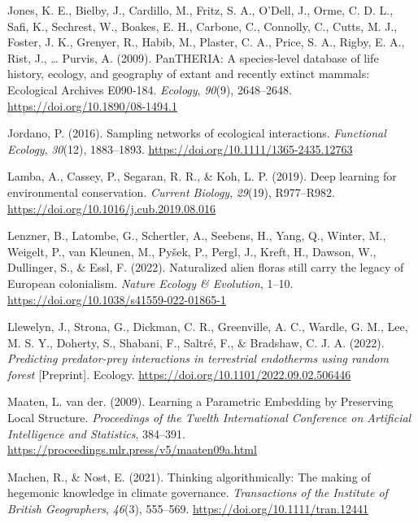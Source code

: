 \documentclass[10pt,oneside]{article}
\newlength{\cslhangindent}
\newenvironment{CSLReferences}[2] %
 {%
  \setlength{\parindent}{0pt}
  \ifodd #1 \everypar{\setlength{\hangindent}{\cslhangindent}}\ignorespaces\fi
  \ifnum #2 > 0
  \setlength{\parskip}{#2\baselineskip}
  \fi
 }%
 {}
\begin{document}
\begin{CSLReferences}{1}{0}
\leavevmode{}%
Jones, K. E., Bielby, J., Cardillo, M., Fritz, S. A., O'Dell, J., Orme,
C. D. L., Safi, K., Sechrest, W., Boakes, E. H., Carbone, C., Connolly,
C., Cutts, M. J., Foster, J. K., Grenyer, R., Habib, M., Plaster, C. A.,
Price, S. A., Rigby, E. A., Rist, J., \ldots{} Purvis, A. (2009).
PanTHERIA: A species‐level database of life history, ecology, and
geography of extant and recently extinct mammals: Ecological Archives
E090‐184. \emph{Ecology}, \emph{90}(9), 2648--2648.
\url{https://doi.org/10.1890/08-1494.1}

\leavevmode{}%
Jordano, P. (2016). Sampling networks of ecological interactions.
\emph{Functional Ecology}, \emph{30}(12), 1883--1893.
\url{https://doi.org/10.1111/1365-2435.12763}

\leavevmode{}%
Lamba, A., Cassey, P., Segaran, R. R., \& Koh, L. P. (2019). Deep
learning for environmental conservation. \emph{Current Biology},
\emph{29}(19), R977--R982.
\url{https://doi.org/10.1016/j.cub.2019.08.016}

\leavevmode{}%
Lenzner, B., Latombe, G., Schertler, A., Seebens, H., Yang, Q., Winter,
M., Weigelt, P., van Kleunen, M., Pyšek, P., Pergl, J., Kreft, H.,
Dawson, W., Dullinger, S., \& Essl, F. (2022). Naturalized alien floras
still carry the legacy of European colonialism. \emph{Nature Ecology \&
Evolution}, 1--10. \url{https://doi.org/10.1038/s41559-022-01865-1}

\leavevmode{}%
Llewelyn, J., Strona, G., Dickman, C. R., Greenville, A. C., Wardle, G.
M., Lee, M. S. Y., Doherty, S., Shabani, F., Saltré, F., \& Bradshaw, C.
J. A. (2022). \emph{Predicting predator-prey interactions in terrestrial
endotherms using random forest} {[}Preprint{]}. Ecology.
\url{https://doi.org/10.1101/2022.09.02.506446}

\leavevmode{}%
Maaten, L. van der. (2009). Learning a Parametric Embedding by
Preserving Local Structure. \emph{Proceedings of the Twelth
International Conference on Artificial Intelligence and Statistics},
384--391. \url{https://proceedings.mlr.press/v5/maaten09a.html}

\leavevmode{}%
Machen, R., \& Nost, E. (2021). Thinking algorithmically: The making of
hegemonic knowledge in climate governance. \emph{Transactions of the
Institute of British Geographers}, \emph{46}(3), 555--569.
\url{https://doi.org/10.1111/tran.12441}


\end{CSLReferences}
\end{document}

